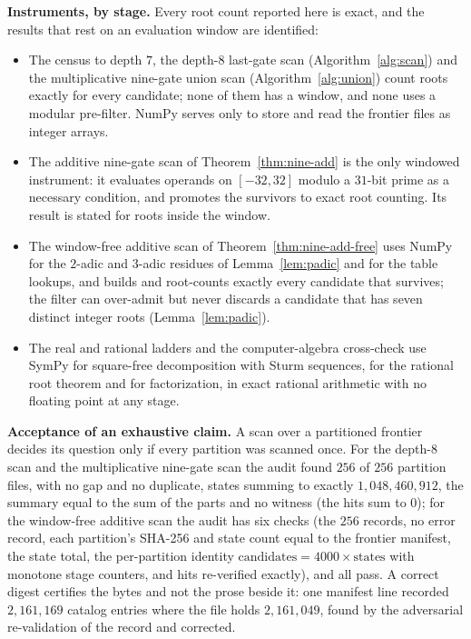 \documentclass[11pt]{article}
\theoremstyle{definition}
\theoremstyle{remark}
\begin{document}
\textbf{Instruments, by stage.} Every root count reported here is exact, and the results that
rest on an evaluation window are identified:
\begin{itemize}
\item The census to depth $7$, the depth-$8$ last-gate scan (Algorithm~\ref{alg:scan}) and
the multiplicative nine-gate union scan (Algorithm~\ref{alg:union}) count roots exactly
for every candidate; none of them has a window, and none uses a modular pre-filter. NumPy
serves only to store and read the frontier files as integer arrays.
\item The additive nine-gate scan of Theorem~\ref{thm:nine-add} is the only windowed
instrument: it evaluates operands on $[-32,32]$ modulo a $31$-bit prime as a necessary
condition, and promotes the survivors to exact root counting. Its result is stated for roots
inside the window.
\item The window-free additive scan of Theorem~\ref{thm:nine-add-free} uses NumPy for the
$2$-adic and $3$-adic residues of Lemma~\ref{lem:padic} and for the table lookups, and
builds and root-counts exactly every candidate that survives; the filter can over-admit but
never discards a candidate that has seven distinct integer roots (Lemma~\ref{lem:padic}).
\item The real and rational ladders and the computer-algebra cross-check use SymPy for
square-free decomposition with Sturm sequences, for the rational root theorem and for
factorization, in exact rational arithmetic with no floating point at any stage.
\end{itemize}

\textbf{Acceptance of an exhaustive claim.} A scan over a partitioned frontier decides its question only if every
partition was scanned once. For the depth-$8$ scan and the multiplicative nine-gate scan the audit found
$256$ of $256$ partition files, with no gap and no duplicate, states summing to exactly
$1{,}048{,}460{,}912$, the summary equal to the sum of the parts and no witness (the hits sum to $0$); for the window-free additive scan the audit has six checks (the $256$ records, no error
record, each partition's SHA-256 and state count equal to the frontier manifest, the state total, the
per-partition identity $\mathrm{candidates} = 4000 \times \mathrm{states}$ with monotone stage
counters, and hits re-verified exactly), and all pass. A correct digest certifies the bytes and not the prose
beside it: one manifest line recorded $2{,}161{,}169$ catalog entries where the file holds
$2{,}161{,}049$, found by the adversarial re-validation of the record and corrected.
\end{document}
